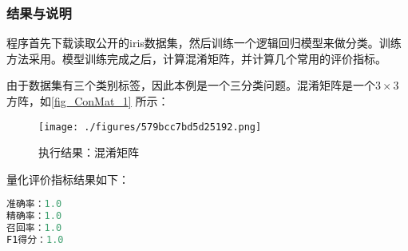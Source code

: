 \subsubsection{结果与说明}
程序首先下载读取公开的iris数据集，然后训练一个逻辑回归模型来做分类。训练方法采用。模型训练完成之后，计算混淆矩阵，并计算几个常用的评价指标。

由于数据集有三个类别标签，因此本例是一个三分类问题。混淆矩阵是一个$3 \times 3$方阵，如\autoref{fig_ConMat_1} 所示：
\begin{figure}[ht]
\centering
\texttt{[image: ./figures/579bcc7bd5d25192.png]}
\caption{执行结果：混淆矩阵} \label{fig_ConMat_1}
\end{figure}

量化评价指标结果如下：
\begin{lstlisting}[language=python]
准确率：1.0
精确率：1.0
召回率：1.0
F1得分：1.0
\end{lstlisting}